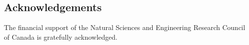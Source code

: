 \documentclass[twocolumn]{bmcart}%
\begin{document}
\begin{backmatter}
\section*{Acknowledgements}
 The financial support of the Natural Sciences and Engineering Research Council of Canada is gratefully acknowledged.









\end{backmatter}
\end{document}
